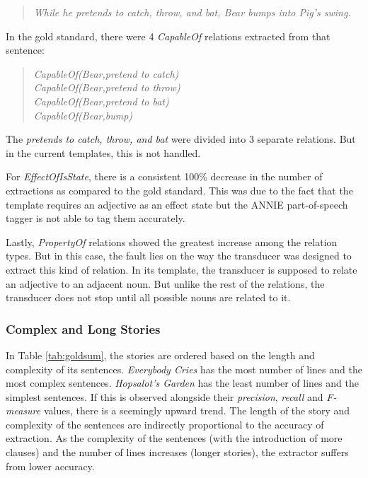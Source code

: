 \begin{verse}
\itshape
While he pretends to catch, throw, and bat, Bear bumps into Pig's swing.
\end{verse}

In the gold standard, there were 4 \textit{CapableOf} relations extracted from that sentence:

\begin{verse}
\itshape
CapableOf(Bear,pretend to catch) \\ 
CapableOf(Bear,pretend to throw)\\
CapableOf(Bear,pretend to bat)\\
CapableOf(Bear,bump)\\
\end{verse}

The \textit{pretends to catch, throw, and bat} were divided into 3 separate relations. But in the current templates, this is not handled.

For \textit{EffectOfIsState}, there is a consistent 100\% decrease in the number of extractions as compared to the gold standard. This was due to the fact that the template requires an adjective as an effect state but the ANNIE part-of-speech tagger is not able to tag them accurately.

Lastly, \textit{PropertyOf} relations showed the greatest increase among the relation types. But in this case, the fault lies on the way the transducer was designed to extract this kind of relation. In its template, the transducer is supposed to relate an adjective to an adjacent noun. But unlike the rest of the relations, the transducer does not stop until all possible nouns are related to it.

\subsubsection*{Complex and Long Stories}

In Table \ref{tab:goldsum}, the stories are ordered based on the length and complexity of its sentences. \textit{Everybody Cries} has the most number of lines and the most complex sentences. \textit{Hopsalot's Garden} has the least number of lines and the simplest sentences. If this is observed alongside their \textit{precision}, \textit{recall} and \textit{F-measure} values, there is a seemingly upward trend. The length of the story and complexity of the sentences are indirectly proportional to the accuracy of extraction. As the complexity of the sentences (with the introduction of more clauses) and the number of lines increases (longer stories), the extractor suffers from lower accuracy.

